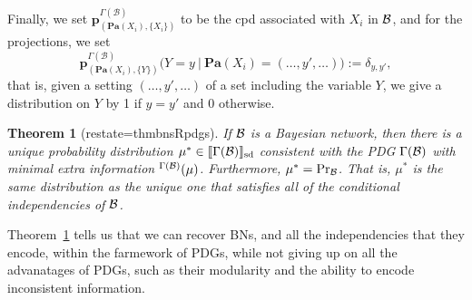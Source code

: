 \documentclass{article}
\theoremstyle{plain}
\newtheorem{theorem}{Theorem}[section]
\theoremstyle{definition}
\theoremstyle{remark}
\let\H\relax
\DeclareMathOperator{\H}{\mathrm{H}} %
\newcommand\mat[1]{\mathbf{#1}}
\DeclarePairedDelimiter{\SD}{\llbracket}{\rrbracket_{\text{sd}}}
\newcommand\Pa{\mathbf{Pa}}
\newcommand\PDGof{\Gamma}
\numberwithin{equation}{section}
\begin{document}
\begin{defn}
		Finally, we set $\mat p^{\PDGof(\mathcal B)}_{(\Pa(X_i), \{X_i\})}$ to be the cpd associated with $X_i$ in $\cal B$, and for the projections, we set 
		\[ \mat p^{\PDGof(\mathcal B)}_{(\Pa(X_i), \{Y\})}\Big(Y = y \ \Big|\ \Pa(X_i) = (\ldots, y', \ldots)\Big) := \delta_{y,y'}, \]
		that is, given a setting $(\ldots, y', \ldots)$ of a set including the variable $Y$, we give a distribution on $Y$ by  1 if $y = y'$ and 0 otherwise.
	\end{defn}
	
	
	\begin{theorem}[restate=thmbnsRpdgs]\label{thm:bns-are-pdgs}
		If $\cal B$ is a Bayesian network, then there is a
                unique probability distribution $\mu^* \in
                \SD{\PDGof(\mathcal B)}$ consistent with the PDG
                $\PDGof(\cal B)$ with minimal extra information
                $\H^{\PDGof(\mathcal B)}(\mu)$. Furthermore, $\mu^* =
                \Pr_{\cal B}$. That is, $\mu^*$ is the same
                distribution as the unique one that satisfies all of
                the conditional independencies of $\cal B$.	 
	\end{theorem}

Theorem~\ref{thm:bns-are-pdgs} tells us that we can recover BNs, and
all the independencies that they encode, within the farmework of PDGs,
while not giving up on all the advanatages of PDGs, such as their
modularity and the ability to encode inconsistent information.
\end{document}
